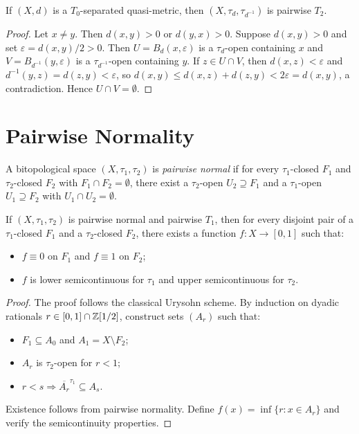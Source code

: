 \begin{theorem}
If $(X,d)$ is a $T_0$-separated quasi-metric, then $(X,\tau_d, \tau_{d^{-1}})$ is
pairwise $T_2$.
\end{theorem}

\begin{proof}
Let $x \neq y$. Then $d(x,y) > 0$ or $d(y,x) > 0$. Suppose $d(x,y) > 0$ and set
$\varepsilon = d(x,y)/2 > 0$. Then $U = B_d(x,\varepsilon)$ is a $\tau_d$-open containing
$x$ and $V = B_{d^{-1}}(y,\varepsilon)$ is a $\tau_{d^{-1}}$-open containing $y$. If
$z \in U \cap V$, then $d(x,z) < \varepsilon$ and $d^{-1}(y,z) = d(z,y) < \varepsilon$,
so $d(x,y) \leq d(x,z) + d(z,y) < 2\varepsilon = d(x,y)$, a contradiction. Hence
$U \cap V = \emptyset$.
\end{proof}

\section{Pairwise Normality}

\begin{definition}
A bitopological space $(X,\tau_1,\tau_2)$ is \emph{pairwise normal} if for every
$\tau_1$-closed $F_1$ and $\tau_2$-closed $F_2$ with $F_1 \cap F_2 = \emptyset$, there
exist a $\tau_2$-open $U_2 \supseteq F_1$ and a $\tau_1$-open $U_1 \supseteq F_2$ with
$U_1 \cap U_2 = \emptyset$.
\end{definition}

\begin{theorem}
If $(X,\tau_1,\tau_2)$ is pairwise normal and pairwise $T_1$, then for every disjoint pair
of a $\tau_1$-closed $F_1$ and a $\tau_2$-closed $F_2$, there exists a function
$f\colon X \to [0,1]$ such that:
\begin{itemize}
  \item $f \equiv 0$ on $F_1$ and $f \equiv 1$ on $F_2$;
  \item $f$ is lower semicontinuous for $\tau_1$ and upper semicontinuous for $\tau_2$.
\end{itemize}
\end{theorem}

\begin{proof}
The proof follows the classical Urysohn scheme. By induction on dyadic rationals
$r \in [0,1] \cap \mathbb{Z}[1/2]$, construct sets $(A_r)$ such that:
\begin{itemize}
  \item $F_1 \subseteq A_0$ and $A_1 = X \setminus F_2$;
  \item $A_r$ is $\tau_2$-open for $r < 1$;
  \item $r < s \Rightarrow \overline{A_r}^{\tau_1} \subseteq A_s$.
\end{itemize}
Existence follows from pairwise normality. Define $f(x) = \inf\{r : x \in A_r\}$ and
verify the semicontinuity properties.
\end{proof}

